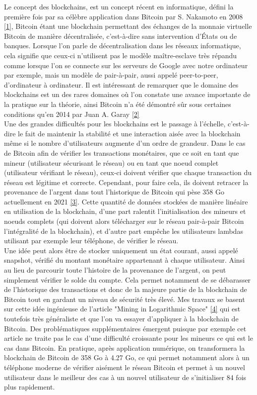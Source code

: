 \documentclass[12pt,a4paper]{article}
\newcommand{\source}[1]{\hyperlink{#1}{[#1]}}
\begin{document}
	Le concept des blockchains, est un concept récent en informatique, défini la première fois par sa célèbre application dans Bitcoin par S. Nakamoto en 2008 \source{1}, Bitcoin étant une blockchain permettant des échanges de la monnaie virtuelle Bitcoin de manière décentralisée, c'est-à-dire sans intervention d'États ou de banques. Lorsque l'on parle de décentralisation dans les réseaux informatique, cela signifie que ceux-ci n'utilisent pas le modèle maître-esclave très répandu comme lorsque l'on se connecte sur les serveurs de Google avec notre ordinateur par exemple, mais un modèle de pair-à-pair, aussi appelé peer-to-peer, d'ordinateur à ordinateur. Il est intéressant de remarquer que le domaine des blockchains est un des rares domaines où l'on constate une avance importante de la pratique sur la théorie, ainsi Bitcoin n'a été démontré sûr sous certaines conditions qu'en 2014 par Juan A. Garay \source{2}\\
	Une des grandes difficultés pour les blockchains est le passage à l'échelle, c'est-à-dire le fait de maintenir la stabilité et une interaction aisée avec la blockchain même si le nombre d'utilisateurs augmente d'un ordre de grandeur. Dans le cas de Bitcoin afin de vérifier les transactions monétaires, que ce soit en tant que mineur (utilisateur sécurisant le réseau) ou en tant que noeud complet (utilisateur vérifiant le réseau), ceux-ci doivent vérifier que chaque transaction du réseau est légitime et correcte. Cependant, pour faire cela, ils doivent retracer la provenance de l'argent dans tout l'historique de Bitcoin qui pèse 358 Go actuellement en 2021 \source{3}. Cette quantité de données stockées de manière linéaire en utilisation de la blockchain, d'une part ralentit l'initialisation des mineurs et noeuds complets (qui doivent alors télécharger sur le réseau pair-à-pair Bitcoin l'intégralité de la blockchain), et d'autre part empêche les utilisateurs lambdas utilisant par exemple leur téléphone, de vérifier le réseau.\\ %
	Une idée peut alors être de stocker uniquement un état courant, aussi appelé snapshot, vérifié du montant monétaire appartenant à chaque utilisateur. Ainsi au lieu de parcourir toute l'histoire de la provenance de l'argent, on peut simplement vérifier le solde du compte. Cela permet notamment de se débarasser de l'historique des transactions et donc de la majeure partie de la blockchain de Bitcoin tout en gardant un niveau de sécurité très élevé. Mes travaux se basent sur cette idée ingénieuse de l'article "Mining in Logarithmic Space" \source{4} qui est toutefois très généraliste et que l'on va essayer d'appliquer à la blockchain de Bitcoin. Des problématiques supplémentaires émergent puisque par exemple cet article ne traite pas le cas d'une difficulté croissante pour les mineurs ce qui est le cas dans Bitcoin. En pratique, après application numérique, on transformera la blockchain de Bitcoin de 358 Go à 4.27 Go, ce qui permet notamment alors à un téléphone moderne de vérifier aisément le réseau Bitcoin et permet à un nouvel utilisateur dans le meilleur des cas à un nouvel utilisateur de s'initialiser 84 fois plus rapidement.\\
\end{document}

